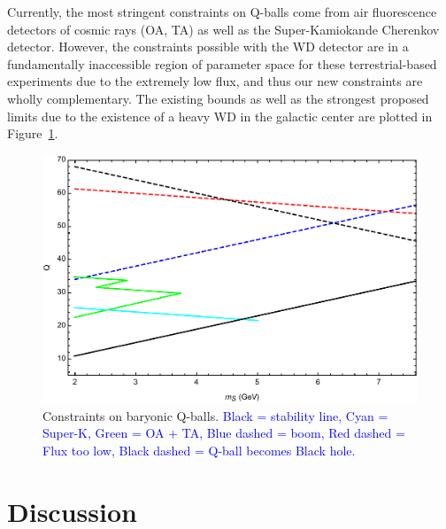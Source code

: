 \documentclass[twocolumn,showpacs,preprintnumbers,amsmath,amssymb,prd]{revtex4}
\begin{document}
Currently, the most stringent constraints on Q-balls come from air fluorescence detectors of cosmic rays (OA, TA) as well as the Super-Kamiokande Cherenkov detector.
However, the constraints possible with the WD detector are in a fundamentally inaccessible region of parameter space for these terrestrial-based experiments due to the extremely low flux, and thus our new constraints are wholly complementary.
The existing bounds as well as the strongest proposed limits due to the existence of a heavy WD in the galactic center are plotted in Figure~\ref{fig:Qballconstraint}.


\begin{figure}
\includegraphics[scale=.45]{Qballconstraint.pdf}
\caption{Constraints on baryonic Q-balls.
\textcolor{blue}{Black = stability line, Cyan = Super-K, Green = OA + TA, Blue dashed = boom, Red dashed = Flux too low, Black dashed = Q-ball becomes Black hole.}}
\label{fig:Qballconstraint}
\end{figure}

\section{Discussion}
\label{sec:discussion}
\end{document}
